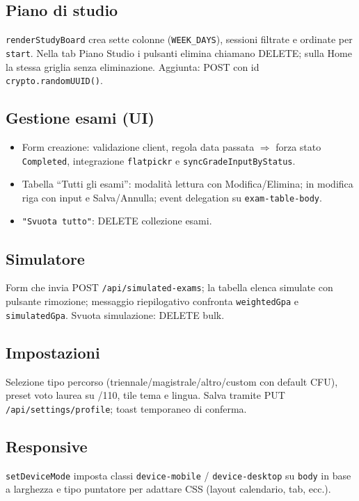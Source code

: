 \documentclass[11pt,a4paper]{article}
\begin{document}
\subsection{Piano di studio}
\texttt{renderStudyBoard} crea sette colonne (\texttt{WEEK\_DAYS}), sessioni filtrate e ordinate per \texttt{start}. Nella tab Piano Studio i pulsanti elimina chiamano DELETE; sulla Home la stessa griglia senza eliminazione. Aggiunta: POST con id \texttt{crypto.randomUUID()}.

\subsection{Gestione esami (UI)}
\begin{itemize}[leftmargin=*]
  \item Form creazione: validazione client, regola data passata $\Rightarrow$ forza stato \texttt{Completed}, integrazione \texttt{flatpickr} e \texttt{syncGradeInputByStatus}.
  \item Tabella ``Tutti gli esami'': modalità lettura con Modifica/Elimina; in modifica riga con input e Salva/Annulla; event delegation su \texttt{exam-table-body}.
  \item \texttt{"Svuota tutto"}: DELETE collezione esami.
\end{itemize}

\subsection{Simulatore}
Form che invia POST \texttt{/api/simulated-exams}; la tabella elenca simulate con pulsante rimozione; messaggio riepilogativo confronta \texttt{weightedGpa} e \texttt{simulatedGpa}. Svuota simulazione: DELETE bulk.

\subsection{Impostazioni}
Selezione tipo percorso (triennale/magistrale/altro/custom con default CFU), preset voto laurea su /110, tile tema e lingua. Salva tramite PUT \texttt{/api/settings/profile}; toast temporaneo di conferma.

\subsection{Responsive}
\texttt{setDeviceMode} imposta classi \texttt{device-mobile} / \texttt{device-desktop} su \texttt{body} in base a larghezza e tipo puntatore per adattare CSS (layout calendario, tab, ecc.).
\end{document}
